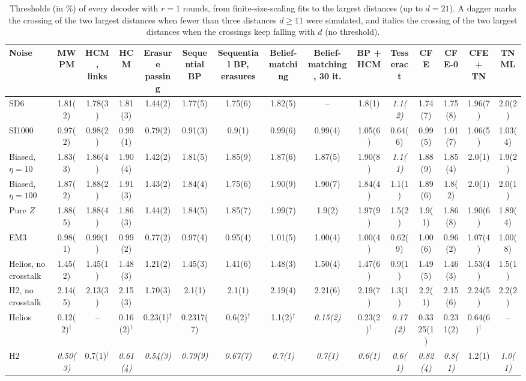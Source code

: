 \begin{table}[t]
  \begin{ruledtabular}
  \begin{tabular}{lcccccccccccccc}
    Noise & MWPM & HCM, links & HCM & Erasure passing & Sequential BP & Sequential BP, erasures & Belief-matching & Belief-matching, 30 it. & BP + HCM & Tesseract & CFE & CFE-0 & CFE + TN & TN ML \\
    \hline
    SD6 & 1.81(2) & 1.78(3) & 1.81(3) & 1.44(2) & 1.77(5) & 1.75(6) & 1.82(5) & -- & 1.8(1) & \textit{1.1(2)} & 1.74(7) & 1.75(8) & 1.96(7) & 2.0(2) \\
    SI1000 & 0.97(2) & 0.98(2) & 0.99(1) & 0.79(2) & 0.91(3) & 0.9(1) & 0.99(6) & 0.99(4) & 1.05(6) & 0.64(6) & 0.99(5) & 1.01(7) & 1.06(5) & 1.03(4) \\
    Biased, $\eta=10$ & 1.83(3) & 1.86(4) & 1.90(4) & 1.42(2) & 1.81(5) & 1.85(9) & 1.87(6) & 1.87(5) & 1.90(8) & \textit{1.1(1)} & 1.88(9) & 1.85(4) & 2.0(1) & 1.9(2) \\
    Biased, $\eta=100$ & 1.87(2) & 1.88(2) & 1.91(3) & 1.43(2) & 1.84(4) & 1.75(6) & 1.90(9) & 1.90(7) & 1.84(4) & 1.1(1) & 1.89(6) & 1.8(2) & 2.0(1) & 2.0(1) \\
    Pure $Z$ & 1.88(5) & 1.88(4) & 1.86(3) & 1.44(2) & 1.84(5) & 1.85(7) & 1.99(7) & 1.9(2) & 1.97(9) & 1.5(2) & 1.9(1) & 1.86(8) & 1.90(6) & 1.89(4) \\
    EM3 & 0.98(1) & 0.99(1) & 0.99(2) & 0.77(2) & 0.97(4) & 0.95(4) & 1.01(5) & 1.00(4) & 1.00(4) & 0.62(9) & 1.00(6) & 0.96(2) & 1.07(4) & 1.00(8) \\
    Helios, no crosstalk & 1.45(2) & 1.45(1) & 1.48(3) & 1.21(2) & 1.45(3) & 1.41(6) & 1.48(3) & 1.50(4) & 1.47(6) & 0.9(1) & 1.49(5) & 1.46(3) & 1.53(4) & 1.5(1) \\
    H2, no crosstalk & 2.14(5) & 2.13(3) & 2.15(3) & 1.70(3) & 2.1(1) & 2.1(1) & 2.19(4) & 2.21(6) & 2.19(7) & 1.3(1) & 2.2(1) & 2.15(6) & 2.24(5) & 2.2(2) \\
    Helios & 0.12(2)$^\dagger$ & -- & 0.16(2)$^\dagger$ & 0.23(1)$^\dagger$ & 0.2317(7) & 0.6(2)$^\dagger$ & 1.1(2)$^\dagger$ & \textit{0.15(2)} & 0.23(2)$^\dagger$ & \textit{0.17(2)} & 0.3325(1) & 0.231(2) & 0.64(6)$^\dagger$ & -- \\
    H2 & \textit{0.50(3)} & 0.7(1)$^\dagger$ & \textit{0.61(4)} & \textit{0.54(3)} & \textit{0.79(9)} & \textit{0.67(7)} & \textit{0.7(1)} & \textit{0.7(1)} & \textit{0.6(1)} & \textit{0.6(1)} & \textit{0.82(4)} & \textit{0.8(1)} & 1.2(1) & \textit{1.0(1)} \\
  \end{tabular}
  \end{ruledtabular}
  \caption{Thresholds (in \%) of every decoder with $r=1$ rounds, from finite-size-scaling fits to the largest distances (up to $d=21$). A dagger marks the crossing of the two largest distances when fewer than three distances $d\ge 11$ were simulated, and italics the crossing of the two largest distances when the crossings keep falling with $d$ (no threshold).}
  \label{tab:campaign_r1}
\end{table}
